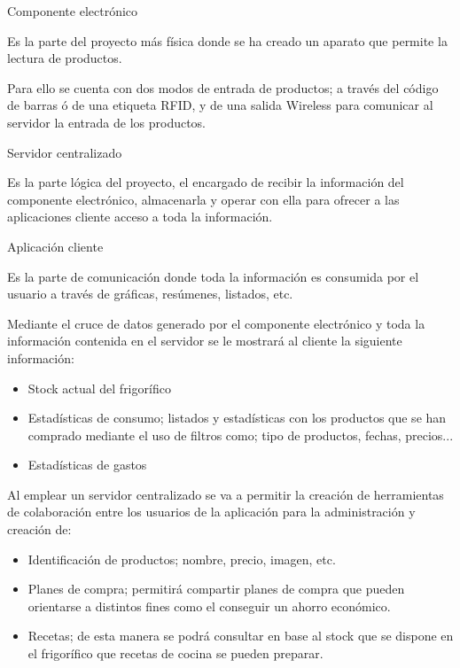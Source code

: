  \begin{description}
    \item Componente electrónico

    Es la parte del proyecto más física donde se ha creado un aparato que permite la lectura de productos.

    Para ello se cuenta con dos modos de entrada de productos; a través del código de barras ó de una etiqueta RFID, y de una salida Wireless para comunicar al servidor la entrada de los productos.

    \item Servidor centralizado

    Es la parte lógica del proyecto, el encargado de recibir la información del componente electrónico, almacenarla y operar con ella para ofrecer a las aplicaciones cliente acceso a toda la información.

    \item Aplicación cliente

    Es la parte de comunicación donde toda la información es consumida por el usuario a través de gráficas, resúmenes, listados, etc.

    Mediante el cruce de datos generado por el componente electrónico y toda la información contenida en el servidor se le mostrará al cliente la siguiente información:
        \begin{itemize}
        \item Stock actual del frigorífico
        \item Estadísticas de consumo; listados y estadísticas con los productos que se han comprado mediante el uso de filtros como; tipo de productos, fechas, precios...
        \item Estadísticas de gastos
        \end{itemize}

    Al emplear un servidor centralizado se va a permitir la creación de herramientas de colaboración entre los usuarios de la aplicación para la administración y creación de:
        \begin{itemize}
        \item Identificación de productos; nombre, precio, imagen, etc.
        \item Planes de compra; permitirá compartir planes de compra que pueden orientarse a distintos fines como el conseguir un ahorro económico.
        \item Recetas; de esta manera se podrá consultar en base al stock que se dispone en el frigorífico que recetas de cocina se pueden preparar.
        \end{itemize}
\end{description}